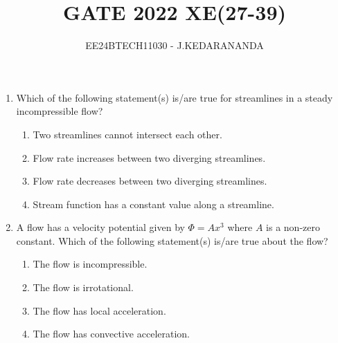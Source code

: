 \documentclass[journal]{IEEEtran}
\renewcommand{\thefigure}{\theenumi}
\renewcommand{\thetable}{\theenumi}
\numberwithin{equation}{enumi}
\numberwithin{figure}{enumi}
\renewcommand{\thetable}{\theenumi}
\begin{document}

\vspace{3cm}

\title{GATE 2022 XE(27-39)}
\author{EE24BTECH11030 - J.KEDARANANDA}
{\let\newpage\relax\maketitle}
\renewcommand{\thefigure}{\theenumi}
\renewcommand{\thetable}{\theenumi}
\begin{enumerate}
    \item Which of the following statement(s) is/are true for streamlines in a steady incompressible flow?
    \begin{enumerate}
        \item Two streamlines cannot intersect each other.
        \item Flow rate increases between two diverging streamlines.
        \item Flow rate decreases between two diverging streamlines.
        \item Stream function has a constant value along a streamline.
    \end{enumerate}

    \bigskip

    \item A flow has a velocity potential given by $\Phi = Ax^3$ where $A$ is a non-zero constant. Which of the following statement(s) is/are true about the flow?
    \begin{enumerate}
        \item The flow is incompressible.
        \item The flow is irrotational.
        \item The flow has local acceleration.
        \item The flow has convective acceleration.
    \end{enumerate}

    \bigskip


\end{enumerate}
\end{document}
